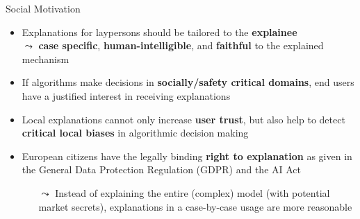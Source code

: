 \documentclass[11pt,compress,t,notes=noshow, aspectratio=169, xcolor=table]{beamer}
\begin{document}
\begin{frame}[t]{Social Motivation}

	\begin{itemize}
		\item Explanations for laypersons should be tailored to the \textbf{explainee}\\ %
		$\leadsto$ \textbf{case specific}, \textbf{human-intelligible}, and \textbf{faithful} to the explained mechanism
		\pause
		\item If algorithms make decisions in \textbf{socially/safety critical domains}, end users have a justified interest in receiving explanations
		\pause
		\item Local explanations cannot only increase \textbf{user trust}, but also help to detect \textbf{critical local biases} in algorithmic decision making
		\pause
		\item European citizens have the legally binding \textbf{right to explanation} as given in the General Data Protection Regulation (GDPR) and the AI Act
		\begin{itemize}
		    \item[$\leadsto$] Instead of explaining the entire (complex) model (with potential market secrets), explanations in a case-by-case usage are more reasonable
		\end{itemize}

	\end{itemize}
\end{frame}
\end{document}

